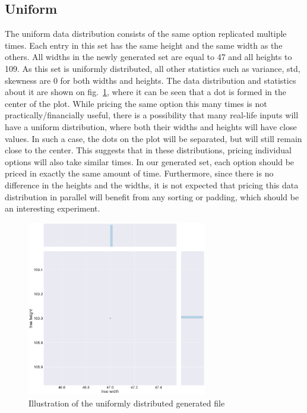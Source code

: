 \subsection{Uniform}
The uniform data distribution consists of the same option replicated multiple times. Each entry in this set has the same height and the same width as the others. All widths in the newly generated set are equal to 47 and all heights to 109. As this set is uniformly distributed, all other statistics such as variance, std, skewness are 0 for both widths and heights. The data distribution and statistics about it are shown on fig.~\ref{fig:experimentmethodology:uniform}, where it can be seen that a dot is formed in the center of the plot. While pricing the same option this many times is not practically/financially useful, there is a possibility that many real-life inputs will have a uniform distribution, where both their widths and heights will have close values. In such a case, the dots on the plot will be separated, but will still remain close to the center. This suggests that in these distributions, pricing individual options will also take similar times. In our generated set, each option should be priced in exactly the same amount of time. Furthermore, since there is no difference in the heights and the widths, it is not expected that pricing this data distribution in parallel will benefit from any sorting or padding, which should be an interesting experiment. 
\begin{figure}[H]
	\centering
	\includegraphics[width=0.7\textwidth]{img/0_UNIFORM_plot.png}
	\caption{Illustration of the uniformly distributed generated file}
	\label{fig:experimentmethodology:uniform}
\end{figure}

